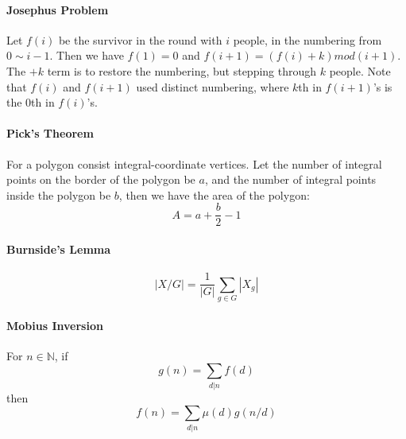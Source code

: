 \paragraph{Josephus Problem}
Let $f(i)$ be the survivor in the round with $i$ people, in the numbering from $0\sim i-1$. Then we have $f(1) = 0$ and $f(i+1) = (f(i)+k) mod (i+1)$. The $+k$ term is to restore the numbering, but stepping through $k$ people. Note that $f(i)$ and $f(i+1)$ used distinct numbering, where $k$th in $f(i+1)$'s is the $0$th in $f(i)$'s.
\paragraph{Pick's Theorem}
For a polygon consist integral-coordinate vertices. Let the number of integral points on the border of the polygon be $a$, and the number of integral points inside the polygon be $b$, then we have the area of the polygon:
$$
A = a+\frac{b}{2}-1
$$
\paragraph{Burnside's Lemma}
$$
|X/G| = \frac{1}{|G|}\sum_{g\in G}{|X_g|}
$$
\paragraph{Mobius Inversion}
For $n\in \mathbb{N}$, if
$$
g(n)=\sum_{d|n}{f(d)}
$$
then
$$
f(n)=\sum_{d|n}{\mu(d)g(n/d)}
$$
